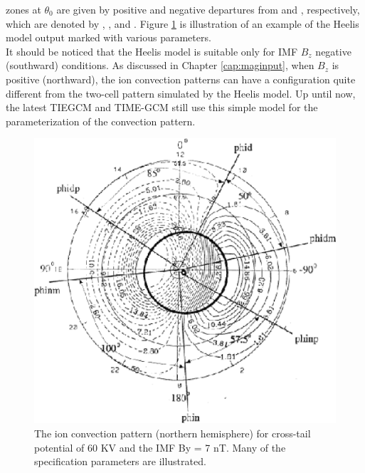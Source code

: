 zones at $\theta_0$ are given by positive and negative departures from  and , 
respectively, which are denoted by , ,  
and . Figure \ref{fig:mag_inp_1} is illustration 
of an example of the Heelis model output marked with various parameters. \\
%
It should be noticed that the Heelis model is suitable only 
for IMF $B_z$ negative (southward) conditions. As discussed in 
Chapter \ref{cap:maginput}, when $B_z$ is positive (northward), the ion 
convection patterns can have a configuration quite 
different from the two-cell pattern simulated by the 
Heelis model. Up until now, the latest TIEGCM and TIME-GCM 
still use this simple model for the parameterization of the 
convection pattern.  
%
\begin{figure}
  \centering
  \includegraphics[scale=1.0, angle=0]{./tex_plot/fig2_wenbin.eps}
  \caption{The ion convection pattern (northern hemisphere) for 
  cross-tail potential of 60 KV and the IMF By = 7 nT. 
  Many of the specification parameters are illustrated. }
   \label{fig:mag_inp_1}
\end{figure}
%
%

